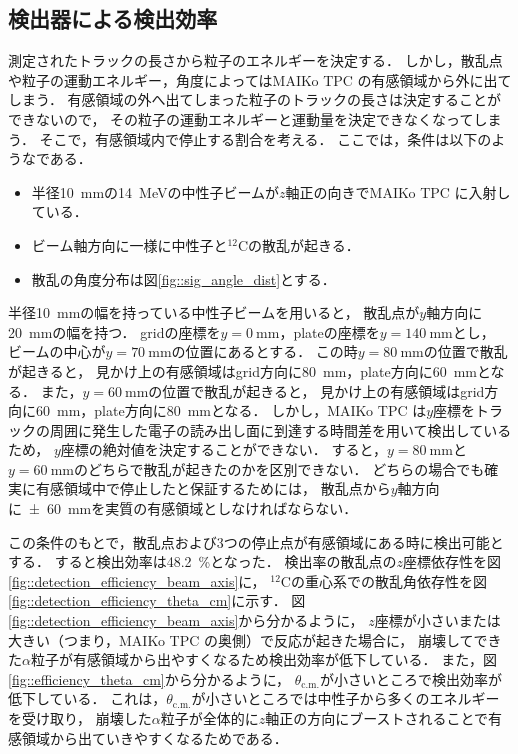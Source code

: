 \documentclass[../master]{subfiles}
\begin{document}
\subsection{検出器による検出効率}
測定されたトラックの長さから粒子のエネルギーを決定する．
しかし，散乱点や粒子の運動エネルギー，角度によってはMAIKo TPC の有感領域から外に出てしまう．
有感領域の外へ出てしまった粒子のトラックの長さは決定することができないので，
その粒子の運動エネルギーと運動量を決定できなくなってしまう．
そこで，有感領域内で停止する割合を考える．
ここでは，条件は以下のようなである．
\begin{itemize}
\item
  半径\SI{10}{\milli\metre}の\SI{14}{\mega\electronvolt}の中性子ビームが$z$軸正の向きでMAIKo TPC に入射している．
\item
  ビーム軸方向に一様に中性子と${}^{12}\mathrm{C}$の散乱が起きる．
\item
  散乱の角度分布は図\ref{fig::sig_angle_dist}とする．
\end{itemize}
半径\SI{10}{\milli\metre}の幅を持っている中性子ビームを用いると，
散乱点が$y$軸方向に\SI{20}{\milli\metre}の幅を持つ．
gridの座標を$y = \SI{0}{\milli\metre}$，plateの座標を$y = \SI{140}{\milli\metre}$とし，
ビームの中心が$y = \SI{70}{\milli\metre}$の位置にあるとする．
この時$y = \SI{80}{\milli\metre}$の位置で散乱が起きると，
見かけ上の有感領域はgrid方向に\SI{80}{\milli\metre}，plate方向に\SI{60}{\milli\metre}となる．
また，$y = \SI{60}{\milli\metre}$の位置で散乱が起きると，
見かけ上の有感領域はgrid方向に\SI{60}{\milli\metre}，plate方向に\SI{80}{\milli\metre}となる．
しかし，MAIKo TPC は$y$座標をトラックの周囲に発生した電子の読み出し面に到達する時間差を用いて検出しているため，
$y$座標の絶対値を決定することができない．
すると，$y = \SI{80}{\milli\metre}$と$y = \SI{60}{\milli\metre}$のどちらで散乱が起きたのかを区別できない．
どちらの場合でも確実に有感領域中で停止したと保証するためには，
散乱点から$y$軸方向に\SI{\pm60}{\milli\metre}を実質の有感領域としなければならない．

この条件のもとで，散乱点および3つの停止点が有感領域にある時に検出可能とする．
すると検出効率は\SI{48.2}{\percent}となった．
検出率の散乱点の$z$座標依存性を図\ref{fig::detection_efficiency_beam_axis}に，
${}^{12}\mathrm{C}$の重心系での散乱角依存性を図\ref{fig::detection_efficiency_theta_cm}に示す．
図\ref{fig::detection_efficiency_beam_axis}から分かるように，
$z$座標が小さいまたは大きい（つまり，MAIKo TPC の奥側）で反応が起きた場合に，
崩壊してできた$\alpha$粒子が有感領域から出やすくなるため検出効率が低下している．
また，図\ref{fig::efficiency_theta_cm}から分かるように，
$\theta_{\text{c.m.}}$が小さいところで検出効率が低下している．
これは，$\theta_{\text{c.m.}}$が小さいところでは中性子から多くのエネルギーを受け取り，
崩壊した$\alpha$粒子が全体的に$z$軸正の方向にブーストされることで有感領域から出ていきやすくなるためである．
\end{document}
